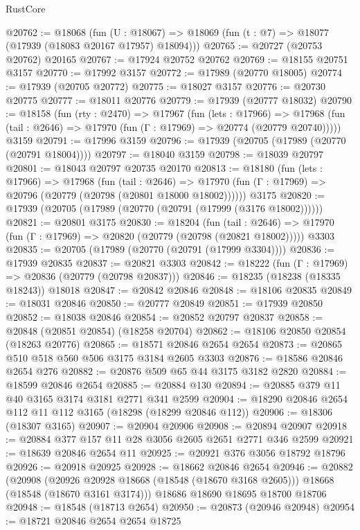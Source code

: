 \begin{lexlean}{RustCore}
\begin{coremodule}
@20762 := @18068
    (fun (U : @18067) => @18069 (fun (t : @7) => @18077 (@17939 (@18083 @20167 @17957) @18094)))
@20765 := @20727 (@20753 @20762) @20165
@20767 := @17924 @20752 @20762
@20769 := @18155 @20751 @3157
@20770 := @17992 @3157
@20772 := @17989 (@20770 @18005)
@20774 := @17939 (@20705 @20772)
@20775 := @18027 @3157
@20776 := @20730 @20775
@20777 := @18011 @20776
@20779 := @17939 (@20777 @18032)
@20790 := @18158
    (fun (rty : @2470) =>
    @17967
      (fun (lets : @17966) =>
      @17968 (fun (tail : @2646) => @17970 (fun (Γ : @17969) => @20774 (@20779 @20740)))))
    @3159
@20791 := @17996 @3159
@20796 := @17939 (@20705 (@17989 (@20770 (@20791 @18004))))
@20797 := @18040 @3159
@20798 := @18039 @20797
@20801 := @18043 @20797 @20735 @20170
@20813 := @18180
    (fun (lets : @17966) =>
    @17968
      (fun (tail : @2646) =>
      @17970 (fun (Γ : @17969) => @20796 (@20779 (@20798 (@20801 @18000 @18002))))))
    @3175
@20820 := @17939 (@20705 (@17989 (@20770 (@20791 (@17999 (@3176 @18002))))))
@20821 := @20801 @3175
@20830 := @18204
    (fun (tail : @2646) => @17970 (fun (Γ : @17969) => @20820 (@20779 (@20798 (@20821 @18002)))))
    @3303
@20835 := @20705 (@17989 (@20770 (@20791 (@17999 @3304))))
@20836 := @17939 @20835
@20837 := @20821 @3303
@20842 := @18222 (fun (Γ : @17969) => @20836 (@20779 (@20798 @20837)))
@20846 := @18235 (@18238 (@18335 @18243)) @18018
@20847 := @20842 @20846
@20848 := @18106 @20835
@20849 := @18031 @20846
@20850 := @20777 @20849
@20851 := @17939 @20850
@20852 := @18038 @20846
@20854 := @20852 @20797 @20837
@20858 := @20848 (@20851 @20854) (@18258 @20704)
@20862 := @18106 @20850 @20854 (@18263 @20776)
@20865 := @18571 @20846 @2654 @2654
@20873 := @20865 @510 @518 @560 @506 @3175 @3184 @2605 @3303
@20876 := @18586 @20846 @2654 @276
@20882 := @20876 @509 @65 @44 @3175 @3182 @2820
@20884 := @18599 @20846 @2654
@20885 := @20884 @130
@20894 := @20885 @379 @11 @40 @3165 @3174 @3181 @2771 @341 @2599
@20904 := @18290 @20846 @2654 @112 @11 @112 @3165 (@18298 (@18299 @20846 @112))
@20906 := @18306 (@18307 @3165)
@20907 := @20904 @20906
@20908 := @20894 @20907
@20918 := @20884 @377 @157 @11 @28 @3056 @2605 @2651 @2771 @346 @2599
@20921 := @18639 @20846 @2654 @11
@20925 := @20921 @376 @3056 @18792 @18796
@20926 := @20918 @20925
@20928 := @18662 @20846 @2654
@20946 := @20882
    (@20908
      (@20926 @20928 @18668 (@18548 (@18670 @3168 @2605)))
      @18668
      (@18548 (@18670 @3161 @3174)))
    @18686
    @18690
    @18695
    @18700
    @18706
@20948 := @18548 (@18713 @2654)
@20950 := @20873 (@20946 @20948)
@20954 := @18721 @20846 @2654 @2654 @18725

\end{coremodule}
\end{lexlean}
